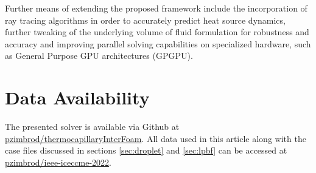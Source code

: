 \documentclass[conference,final,a4paper]{IEEEtran}
\begin{document}
Further means of extending the proposed framework include the incorporation of ray tracing algorithms in order to accurately predict heat source dynamics, further tweaking of the underlying volume of fluid formulation for robustness and accuracy and improving parallel solving capabilities on specialized hardware, such as General Purpose GPU architectures (GPGPU).

\section{Data Availability}\label{sec:data}

The presented solver is available via Github at \href{https://github.com/pzimbrod/thermocapillaryInterFoam}{pzimbrod/thermocapillaryInterFoam}. All data used in this article along with the case files discussed in sections \ref{sec:droplet} and \ref{sec:lpbf} can be accessed at \href{https://github.com/pzimbrod/ieee-iceccme-2022}{pzimbrod/ieee-iceccme-2022}.



\end{document}
